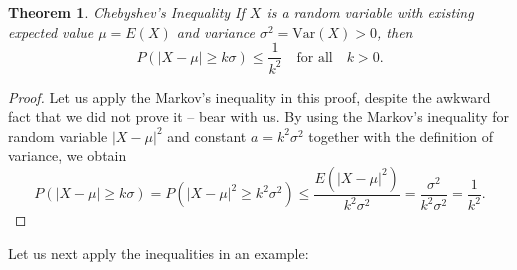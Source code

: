 \documentclass[12pt,a4paper,leqno]{report}
\newcommand{\var}{\mathrm{Var}}
\theoremstyle{plain}
\newtheorem{lause}[equation]{Theorem}
\theoremstyle{definition}
\begin{document}
\begin{lause}
Chebyshev's Inequality If $X$ is a random variable with existing expected value $\mu = E(X)$ and variance $\sigma^2 = \var(X) > 0$, then
\[
P(|X-\mu| \geq k\sigma ) \leq \frac{1}{k^2} \quad \text{for all} \quad k > 0.
\]
\end{lause}

\begin{proof}
Let us apply the Markov's inequality in this proof, despite the awkward fact that we did not prove it -- bear with us. By using the Markov's inequality for random variable $|X-\mu|^2$ and constant $a = k^2\sigma^2$ together with the definition of variance, we obtain
\[
P(|X-\mu|\geq k\sigma) = P(|X-\mu|^2 \geq k^2\sigma^2) \leq \frac{E(|X - \mu|^2)}{k^2 \sigma^2} = \frac{\sigma^2}{k^2\sigma^2} = \frac{1}{k^2}.
\] 
\end{proof}

Let us next apply the inequalities in an example:
\end{document}

